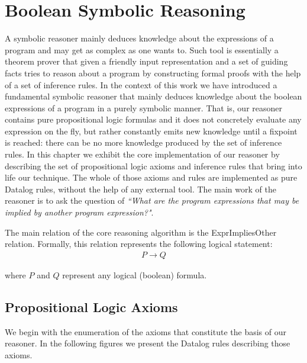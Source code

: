 \section{Boolean Symbolic Reasoning}

A symbolic reasoner mainly deduces knowledge about the expressions of a program and may get
as complex as one wants to. Such tool is essentially a theorem prover that given a
friendly input representation and a set of guiding facts tries to reason about a program
by constructing formal proofs with the help of a set of inference rules. In the context of this
work we have introduced a fundamental symbolic reasoner that mainly deduces knowledge about the
boolean expressions of a program in a purely symbolic manner. That is, our reasoner
contains pure propositional logic formulas and it
does not concretely evaluate any expression on the fly, but rather constantly emits
new knowledge until a fixpoint is reached: there can be no more knowledge produced by
the set of inference rules. In this chapter we exhibit the core implementation of our
reasoner by describing the set of propositional logic axioms and inference rules that
bring into life our technique. The whole of those axioms and rules are implemented as
pure Datalog rules, without the help of any external tool. The main work of the reasoner
is to ask the question of \emph{``What are the program expressions that may be implied by another program expression?"}.

The main relation of the core reasoning algorithm is the ExprImpliesOther relation. Formally,
this relation represents the following logical statement:\\

\begin{equation}
  \label{eq:implies}
  \begin{aligned}
    P \rightarrow Q
  \end{aligned}
\end{equation}

where $P$ and $Q$ represent any logical (boolean) formula.

\subsection{Propositional Logic Axioms}

We begin with the enumeration of the axioms that constitute the basis of our reasoner.
In the following figures we present the Datalog rules describing those axioms.

